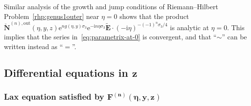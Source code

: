 \documentclass[pdftex]{sigma}
\numberwithin{equation}{section}
\begin{document}
\begin{Remark}\label{rem:zero}
Similar analysis of the growth and jump conditions of Riemann--Hilbert Problem~\ref{rhp:genus1outer} near $\eta=0$ shows that the product $\breve{\mathbf{N}}^{(n),\mathrm{out}}(\eta,y,z)\mathrm{e}^{ng(\eta,y)\sigma_3}\mathrm{e}^{-\mathrm{i} n\eta\sigma_3}\widetilde{\mathbf{E}}\cdot(-\mathrm{i}\eta)^{-(-1)^n\sigma_3/4}$ is analytic at $\eta=0$. This implies that the series in~\eqref{eq:parametrix-at-0} is convergent, and that ``$\sim$'' can be written instead as ``$=$''.
\end{Remark}

\subsection[Differential equations in z]{Differential equations in $\boldsymbol{z}$}\label{sec:ODEz}

\subsubsection[Lax equation satisfied by F\^{}\{(n)\}(eta,y,z)]{Lax equation satisfied by $\boldsymbol{\mathbf{F}^{(n)}(\eta,y,z)}$}
\end{document}
